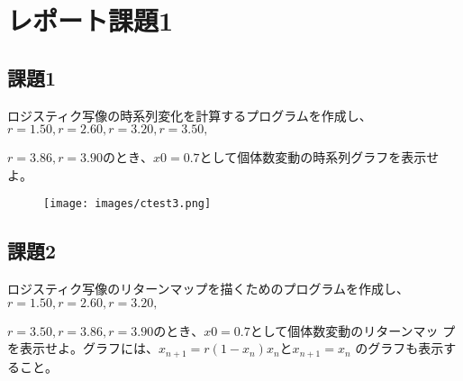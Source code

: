 \section{レポート課題1}
\subsection{課題1}
ロジスティク写像の時系列変化を計算するプログラムを作成し、$r = 1.50, r = 2.60,r = 3.20, r = 3.50,$ \par
$r = 3.86, r = 3.90 のとき、x0 = 0.7$として個体数変動の時系列グラフを表示せよ。\par
\begin{figure}
  \texttt{[image: images/ctest3.png]}
\end{figure}

\subsection{課題2}
ロジスティク写像のリターンマップを描くためのプログラムを作成し、$r = 1.50, r = 2.60, r = 3.20,$ \par
$r = 3.50, r = 3.86, r = 3.90 のとき、x0 = 0.7$として個体数変動のリターンマッ
プを表示せよ。グラフには、$x_{n+1} = r(1 −x_n)x_n とx_{n+1} = x_n$ のグラフも表示すること。